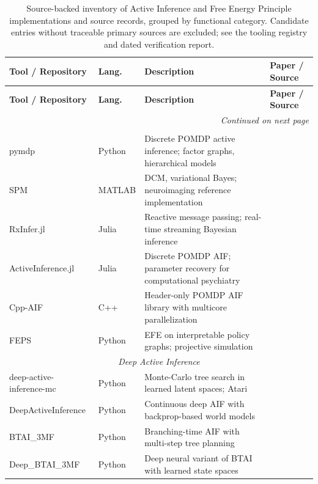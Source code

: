 \documentclass[
  english,
]{article}
\begin{document}
\begin{center}
\small
\begin{longtable}{p{3.2cm} p{1.6cm} p{6.4cm} p{2.5cm}}
\caption{Source-backed inventory of Active Inference and Free Energy Principle implementations and source records, grouped by functional category. Candidate entries without traceable primary sources are excluded; see the tooling registry and dated verification report.}
\label{tab:tool_survey} \\
\toprule
\textbf{Tool / Repository} & \textbf{Lang.} & \textbf{Description} & \textbf{Paper / Source} \\
\midrule
\endfirsthead
\toprule
\textbf{Tool / Repository} & \textbf{Lang.} & \textbf{Description} & \textbf{Paper / Source} \\
\midrule
\endhead
\midrule
\multicolumn{4}{r}{\textit{Continued on next page}} \\
\endfoot
\bottomrule
\endlastfoot
\multicolumn{4}{c}{\textit{General-Purpose Frameworks}} \\
\midrule
pymdp & Python & Discrete POMDP active inference; factor graphs, hierarchical models & \cite{heins2022pymdp} \\
SPM & MATLAB & DCM, variational Bayes; neuroimaging reference implementation & \cite{friston2017active} \\
RxInfer.jl & Julia & Reactive message passing; real-time streaming Bayesian inference & \cite{rxinfer2025} \\
ActiveInference.jl & Julia & Discrete POMDP AIF; parameter recovery for computational psychiatry & \cite{ActiveInferencejl} \\
Cpp-AIF & C++ & Header-only POMDP AIF library with multicore parallelization & \cite{gregoretti2023cppaif} \\
FEPS & Python & EFE on interpretable policy graphs; projective simulation & \cite{pazem2024feps} \\
\midrule
\multicolumn{4}{c}{\textit{Deep Active Inference}} \\
\midrule
deep-active-inference-mc & Python & Monte-Carlo tree search in learned latent spaces; Atari & \cite{fountas2020deep} \\
DeepActiveInference & Python & Continuous deep AIF with backprop-based world models & \cite{millidge2020deep} \\
BTAI\_3MF & Python & Branching-time AIF with multi-step tree planning & \cite{champion2021realizing} \\
Deep\_BTAI\_3MF & Python & Deep neural variant of BTAI with learned state spaces & \cite{champion2021realizing} \\

\end{longtable}
\end{center}
\end{document}
